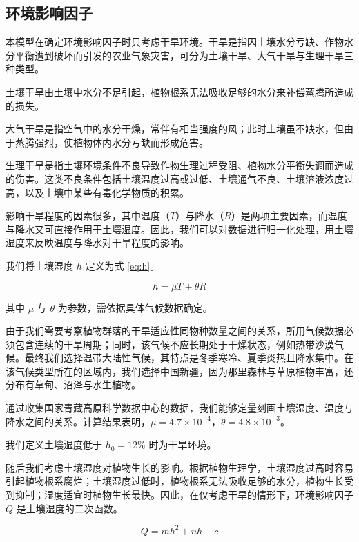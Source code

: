\documentclass[11pt,a4paper]{ctexart}
\begin{document}
\subsection{环境影响因子}

本模型在确定环境影响因子时只考虑干旱环境。干旱是指因土壤水分亏缺、作物水分平衡遭到破坏而引发的农业气象灾害，可分为土壤干旱、大气干旱与生理干旱三种类型。

土壤干旱由土壤中水分不足引起，植物根系无法吸收足够的水分来补偿蒸腾所造成的损失。

大气干旱是指空气中的水分干燥，常伴有相当强度的风；此时土壤虽不缺水，但由于蒸腾强烈，使植物体内水分亏缺而形成危害。

生理干旱是指土壤环境条件不良导致作物生理过程受阻、植物水分平衡失调而造成的伤害。这类不良条件包括土壤温度过高或过低、土壤通气不良、土壤溶液浓度过高，以及土壤中某些有毒化学物质的积累。

影响干旱程度的因素很多，其中温度（$T$）与降水（$R$）是两项主要因素，而温度与降水又可直接作用于土壤湿度。因此，我们可以对数据进行归一化处理，用土壤湿度来反映温度与降水对干旱程度的影响。

我们将土壤湿度 $h$ 定义为式 \eqref{eq:h}。

\begin{equation}
h=\mu T+\theta R
\label{eq:h}
\end{equation}

其中 $\mu$ 与 $\theta$ 为参数，需依据具体气候数据确定。

由于我们需要考察植物群落的干旱适应性同物种数量之间的关系，所用气候数据必须包含连续的干旱周期；同时，该气候不应长期处于干燥状态，例如热带沙漠气候。最终我们选择温带大陆性气候，其特点是冬季寒冷、夏季炎热且降水集中。在该气候类型所在的区域内，我们选择中国新疆，因为那里森林与草原植物丰富，还分布有草甸、沼泽与水生植物。

通过收集国家青藏高原科学数据中心\cite{ref4}的数据，我们能够定量刻画土壤湿度、温度与降水之间的关系。计算结果表明，$\mu=4.7\times 10^{-4}$，$\theta=4.8\times 10^{-3}$。

我们定义土壤湿度低于 $h_0=12\%$ 时为干旱环境。

随后我们考虑土壤湿度对植物生长的影响。根据植物生理学，土壤湿度过高时容易引起植物根系腐烂；土壤湿度过低时，植物根系无法吸收足够的水分，植物生长受到抑制；湿度适宜时植物生长最快。因此，在仅考虑干旱的情形下，环境影响因子 $Q$ 是土壤湿度的二次函数\cite{ref5}。

\begin{equation}
Q=mh^{2}+nh+c
\label{eq:Q}
\end{equation}
\end{document}
